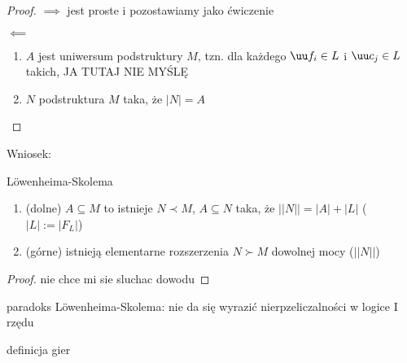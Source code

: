 \begin{proof}
  $\implies$ jest proste i pozostawiamy jako ćwiczenie

  $\impliedby$

  \begin{enumerate}[label=\alph*)]
    \item $A$ jest uniwersum podstruktury $M$, tzn. dla każdego $\uu f_i\in L$ i $\uu c_j\in L$ takich, 
      {\large\color{red}JA TUTAJ NIE MYŚLĘ}
    \item $N$ podstruktura $M$ taka, że $|N|=A$
  \end{enumerate}
\end{proof}

Wniosek:
\begin{theorem}{L\"owenheima-Skolema}{}
  \begin{enumerate}
    \item (dolne) $A\subseteq M$ to istnieje $N\prec M$, $A\subseteq N$ taka, że $||N||=|A|+|L|$ ($|L|:=|F_L|$)
    \item (górne) istnieją elementarne rozszerzenia $N\succ M$ dowolnej mocy ($||N||$)
  \end{enumerate}
\end{theorem}

\begin{proof}
  nie chce mi sie sluchac dowodu
\end{proof}

paradoks L\"owenheima-Skolema: nie da się wyrazić nierpzeliczalności w logice I rzędu

definicja gier




